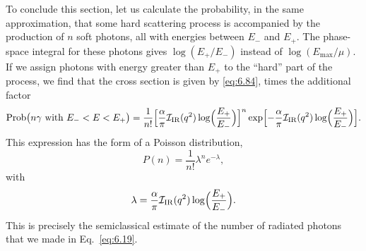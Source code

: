 To conclude this section, let us calculate the probability, in the same
approximation, that some hard scattering process is accompanied by the
production of $n$ soft photons, all with energies between $E_{-}$ and $E_{+}$.
The phase-space integral for these photons gives $\log(E_{+}/E_{-})$ instead
of $\log(E_{\mathrm{max}}/\mu)$.  If we assign photons with energy greater
than $E_{+}$ to the ``hard'' part of the process, we find that the cross
section is given by \eqref{eq:6.84}, times the additional factor
\begin{equation}
  \mathrm{Prob}\bigl( n\gamma \text{ with } E_{-} < E < E_{+} \bigr)
    = \frac{1}{n!}\Bigl[ \frac{\alpha}{\pi}\mathcal{I}_{\mathrm{IR}}(q^2)
      \log\Bigl( \frac{E_{+}}{E_{-}} \Bigr) \Bigr]^n
      \exp\Bigl[ -\frac{\alpha}{\pi}\mathcal{I}_{\mathrm{IR}}(q^2)
      \log\Bigl( \frac{E_{+}}{E_{-}} \Bigr) \Bigr] .
  \label{eq:6.86}
\end{equation}
This expression has the form of a Poisson distribution,
\begin{equation}
  P(n) = \frac{1}{n!}\lambda^n e^{-\lambda},
\end{equation}
with
\begin{equation}
  \lambda = \frac{\alpha}{\pi}\mathcal{I}_{\mathrm{IR}}(q^2)\log\Bigl(
    \frac{E_{+}}{E_{-}} \Bigr) .
\end{equation}
This is precisely the semiclassical estimate of the number of radiated photons
that we made in Eq.~\eqref{eq:6.19}.

\problems

